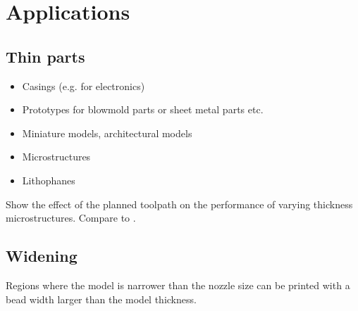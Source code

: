 \section{Applications}

\subsection{Thin parts}
\begin{itemize}
\item Casings (e.g. for electronics)
\item Prototypes for blowmold parts or sheet metal parts etc.
\item Miniature models, architectural models
\item Microstructures
\item Lithophanes
\end{itemize}

Show the effect of the planned toolpath on the performance of varying thickness microstructures.
Compare to \cite{bates2018compressive}.



\subsection{Widening}
Regions where the model is narrower than the nozzle size can be printed with a bead width larger than the model thickness.